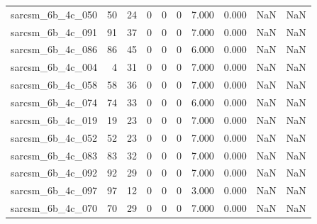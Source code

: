 \documentclass{article}
\begin{document}
\begin{longtable}{lrrrrrrrrr}
sarcsm\_6b\_4c\_050 & 50 & 24 & 0 & 0 & 0 & 7.000 & 0.000 & NaN & NaN \\
sarcsm\_6b\_4c\_091 & 91 & 37 & 0 & 0 & 0 & 7.000 & 0.000 & NaN & NaN \\
sarcsm\_6b\_4c\_086 & 86 & 45 & 0 & 0 & 0 & 6.000 & 0.000 & NaN & NaN \\
sarcsm\_6b\_4c\_004 & 4 & 31 & 0 & 0 & 0 & 7.000 & 0.000 & NaN & NaN \\
sarcsm\_6b\_4c\_058 & 58 & 36 & 0 & 0 & 0 & 7.000 & 0.000 & NaN & NaN \\
sarcsm\_6b\_4c\_074 & 74 & 33 & 0 & 0 & 0 & 6.000 & 0.000 & NaN & NaN \\
sarcsm\_6b\_4c\_019 & 19 & 23 & 0 & 0 & 0 & 7.000 & 0.000 & NaN & NaN \\
sarcsm\_6b\_4c\_052 & 52 & 23 & 0 & 0 & 0 & 7.000 & 0.000 & NaN & NaN \\
sarcsm\_6b\_4c\_083 & 83 & 32 & 0 & 0 & 0 & 7.000 & 0.000 & NaN & NaN \\
sarcsm\_6b\_4c\_092 & 92 & 29 & 0 & 0 & 0 & 7.000 & 0.000 & NaN & NaN \\
sarcsm\_6b\_4c\_097 & 97 & 12 & 0 & 0 & 0 & 3.000 & 0.000 & NaN & NaN \\
sarcsm\_6b\_4c\_070 & 70 & 29 & 0 & 0 & 0 & 7.000 & 0.000 & NaN & NaN \\
\end{longtable}
\end{document}
